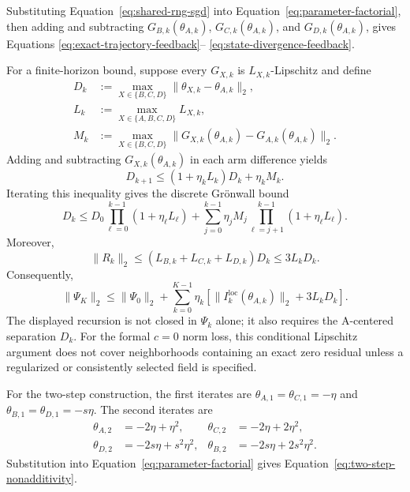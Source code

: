\documentclass{article}
\begin{document}
Substituting Equation~\eqref{eq:shared-rng-sgd} into
Equation~\eqref{eq:parameter-factorial}, then adding and subtracting
$G_{B,k}(\theta_{A,k})$, $G_{C,k}(\theta_{A,k})$, and
$G_{D,k}(\theta_{A,k})$, gives Equations
\eqref{eq:exact-trajectory-feedback}--
\eqref{eq:state-divergence-feedback}.

For a finite-horizon bound, suppose every $G_{X,k}$ is
$L_{X,k}$-Lipschitz and define
\begin{align}
  D_k&:=\max_{X\in\{B,C,D\}}
    \lVert\theta_{X,k}-\theta_{A,k}\rVert_2,\\
  L_k&:=\max_{X\in\{A,B,C,D\}}L_{X,k},\\
  M_k&:=\max_{X\in\{B,C,D\}}
    \lVert G_{X,k}(\theta_{A,k})-G_{A,k}(\theta_{A,k})\rVert_2.
\end{align}
Adding and subtracting $G_{X,k}(\theta_{A,k})$ in each arm difference yields
\begin{equation}
  D_{k+1}\leq(1+\eta_kL_k)D_k+\eta_kM_k.
  \label{eq:diameter-recursion}
\end{equation}
Iterating this inequality gives the discrete Gr\"onwall bound
\begin{equation}
  D_k\leq
  D_0\prod_{\ell=0}^{k-1}(1+\eta_\ell L_\ell)
  +\sum_{j=0}^{k-1}\eta_jM_j
    \prod_{\ell=j+1}^{k-1}(1+\eta_\ell L_\ell).
  \label{eq:diameter-gronwall}
\end{equation}
Moreover,
\begin{equation}
  \lVert R_k\rVert_2
  \leq(L_{B,k}+L_{C,k}+L_{D,k})D_k
  \leq3L_kD_k.
\end{equation}
Consequently,
\begin{equation}
  \lVert\Psi_K\rVert_2
  \leq\lVert\Psi_0\rVert_2
  +\sum_{k=0}^{K-1}\eta_k
  \left[
    \lVert I_k^{\mathrm{loc}}(\theta_{A,k})\rVert_2+3L_kD_k
  \right].
  \label{eq:factorial-finite-horizon-bound}
\end{equation}
The displayed recursion is not closed in $\Psi_k$ alone; it also requires the
A-centered separation $D_k$. For the formal $c=0$ norm loss, this conditional
Lipschitz argument does not cover neighborhoods containing an exact zero
residual unless a regularized or consistently selected field is specified.

For the two-step construction, the first iterates are
$\theta_{A,1}=\theta_{C,1}=-\eta$ and
$\theta_{B,1}=\theta_{D,1}=-s\eta$. The second iterates are
\begin{align}
  \theta_{A,2}&=-2\eta+\eta^2,&
  \theta_{C,2}&=-2\eta+2\eta^2,\\
  \theta_{D,2}&=-2s\eta+s^2\eta^2,&
  \theta_{B,2}&=-2s\eta+2s^2\eta^2.
\end{align}
Substitution into Equation~\eqref{eq:parameter-factorial} gives
Equation~\eqref{eq:two-step-nonadditivity}.
\end{document}
